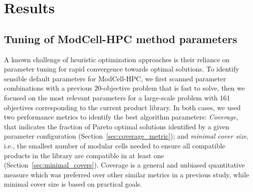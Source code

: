 {\section{Results}

\subsection{Tuning of ModCell-HPC method parameters}

A known challenge of heuristic optimization approaches is their reliance on parameter tuning for rapid convergence towards optimal solutions.
To identify sensible default parameters for ModCell-HPC, we first scanned parameter combinations with a previous\citep{garcia2019} 20-objective problem that is fast to solve, then we focused on the most relevant parameters for a large-scale problem with 161 objectives corresponding to the current product library.
In both cases, we used two performance metrics to identify the best algorithm parameters:
\emph{Coverage}, that indicates the fraction of Pareto optimal solutions identified by a given parameter configuration (Section~\ref{sec:coverage_metric});
and \emph{minimal cover size}, i.e., the smallest number of modular cells needed to ensure all compatible products in the library are compatible in at least one (Section~\ref{sec:minimal_covers}). Coverage is a general and unbiased quantitative measure which was preferred over other similar metrics in a previous study,\citep{garcia2019c} while minimal cover size is based on practical goals.

}
